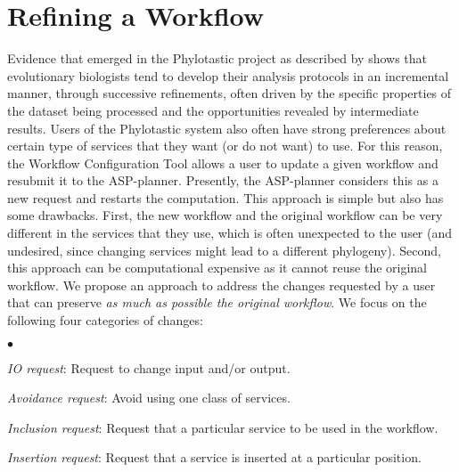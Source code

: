 \documentclass{new_tlp}
\begin{document}
 

\section{Refining a Workflow}
\label{sub:replanning_problem}


Evidence that emerged in the Phylotastic project as described by  shows that evolutionary biologists tend to develop their analysis protocols in an incremental manner, through successive refinements, often driven by the specific properties of the dataset being processed and the opportunities revealed by intermediate results.
 Users of the Phylotastic system also often have strong preferences about certain type of services that they want (or do not want) to use. For this reason,  the Workflow Configuration Tool  allows a user to update a given workflow and resubmit it to the ASP-planner. Presently, the ASP-planner considers this as a new request and restarts the computation. This approach is simple but also has some drawbacks. First, the new workflow and the original workflow can be very different in the services that they use, which is often unexpected to the user (and undesired, since changing services might lead to a different phylogeny). Second, this approach can be computational expensive as it cannot reuse the original workflow. We propose an approach to 
 address the changes requested by a user that can preserve \emph{as much as possible the original workflow}. We focus on the following four categories of changes:
\begin{list}{$\bullet$}{\itemsep=0pt \parsep=1pt \topsep=1pt}
    \item {\em IO request}: Request to change input and/or output.
    \item {\em Avoidance request}: Avoid using one class of services.
    \item {\em Inclusion request}: Request that a particular service to be used in the workflow.
    \item {\em Insertion request}: Request that a service is inserted at a particular position.   
\end{list}


\end{document}
